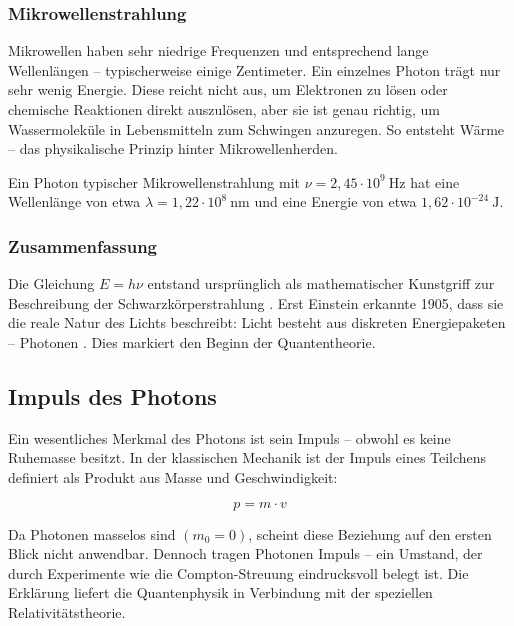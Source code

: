 \subsubsection*{Mikrowellenstrahlung}
Mikrowellen haben sehr niedrige Frequenzen und entsprechend lange Wellenlängen – typischerweise einige Zentimeter. Ein einzelnes Photon trägt nur sehr wenig Energie. Diese reicht nicht aus, um Elektronen zu lösen oder chemische Reaktionen direkt auszulösen, aber sie ist genau richtig, um Wassermoleküle in Lebensmitteln zum Schwingen anzuregen. So entsteht Wärme – das physikalische Prinzip hinter Mikrowellenherden.
\vspace{1em}
\begin{tcolorbox}[physikbox, title=Mikrowellenstrahlung]
	\label{box:Mikrowellenstrahlung}
	Ein Photon typischer Mikrowellenstrahlung mit \( \nu = 2{,}45 \cdot 10^9~\mathrm{Hz} \) hat eine Wellenlänge von etwa \( \lambda = 1{,}22\cdot 10^8~\mathrm{nm} \)
	und eine Energie von etwa \( 1{,}62 \cdot 10^{-24}~\mathrm{J} \).
\end{tcolorbox}

\subsubsection{Zusammenfassung}

\begin{tcolorbox}[mathebox,title=Photonen als Energiequanten]
	\label{box:Photon als Energiequanten}
	Die Gleichung $E = h \nu$ entstand ursprünglich als mathematischer Kunstgriff zur Beschreibung der Schwarzkörperstrahlung \cite{planck1948}. Erst Einstein erkannte 1905, dass sie die reale Natur des Lichts beschreibt: Licht besteht aus diskreten Energiepaketen – Photonen \cite{einstein1905}. Dies markiert den Beginn der Quantentheorie.
\end{tcolorbox}

\subsection{Impuls des Photons}

Ein wesentliches Merkmal des Photons ist sein Impuls – obwohl es keine Ruhemasse besitzt. In der klassischen Mechanik ist der Impuls eines Teilchens definiert als Produkt aus Masse und Geschwindigkeit:

\[
p = m \cdot v
\]

Da Photonen masselos sind \((m_0 = 0)\), scheint diese Beziehung auf den ersten Blick nicht anwendbar. Dennoch tragen Photonen Impuls – ein Umstand, der durch Experimente wie die Compton-Streuung eindrucksvoll belegt ist. Die Erklärung liefert die Quantenphysik in Verbindung mit der speziellen Relativitätstheorie.

